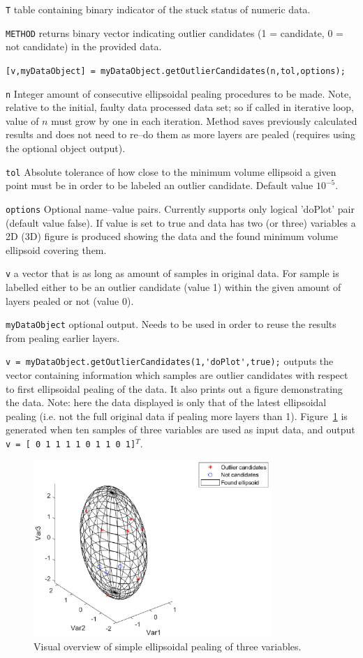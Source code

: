 \documentclass[twoside,a4paper]{refart}
\begin{document}
\verb|T| table containing binary indicator of the stuck status of numeric data.

\verb|METHOD| returns binary vector indicating outlier candidates (1 = candidate, 0 = not candidate) in the provided data.

\verb|[v,myDataObject] = myDataObject.getOutlierCandidates(n,tol,options);|

\verb|n| Integer amount of consecutive ellipsoidal pealing procedures to be made. Note, relative to the initial, faulty data processed data set; so if called in iterative loop, value of $n$ must grow by one in each iteration. Method saves previously calculated results and does not need to re--do them as more layers are pealed (requires using the optional object output).

\verb|tol| Absolute tolerance of how close to the minimum volume ellipsoid a given point must be in order to be labeled an outlier candidate. Default value $10^{-5}$.

\verb|options| Optional name--value pairs. Currently supports only logical 'doPlot' pair (default value false). If value is set to true and data has two (or three) variables a 2D (3D) figure is produced showing the data and the found minimum volume ellipsoid covering them.

\verb|v| a vector that is as long as amount of samples in original data. For sample is labelled either to be an outlier candidate (value 1) within the given amount of layers pealed or not (value 0).

\verb|myDataObject| optional output. Needs to be used in order to reuse the results from pealing earlier layers.

\verb|v = myDataObject.getOutlierCandidates(1,'doPlot',true);| outputs the vector containing information which samples are outlier candidates with respect to first ellipsoidal pealing of the data. It also prints out a figure demonstrating the data. Note: here the data displayed is only that of the latest ellipsoidal pealing (i.e. not the full original data if pealing more layers than 1). Figure~\ref{fig:3d} is generated when ten samples of three variables are used as input data, and output \verb|v = [ 0 1 1 1 1 0 1 1 0 1]|$^T$.

\begin{figure}[H]
\begin{center}
\includegraphics[width = 0.8\textwidth]{ep3d}
\end{center}
\caption{Visual overview of simple ellipsoidal pealing of three variables.}
\label{fig:3d}
\end{figure}

\printindex
\end{document}
